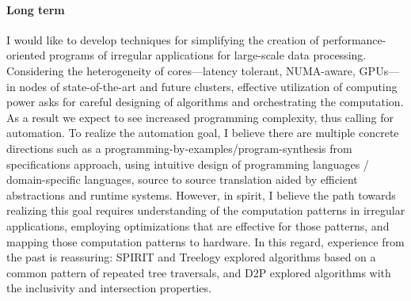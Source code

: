 \paragraph{Long term} I would like to develop techniques for simplifying the creation of performance-oriented programs of irregular applications for large-scale data processing. 
Considering the heterogeneity of cores---latency tolerant, NUMA-aware, GPUs---in nodes of state-of-the-art and future clusters, effective utilization of computing power asks for careful designing of algorithms and orchestrating the computation. 
As a result we expect to see increased programming complexity, thus calling for automation. 
To realize the automation goal, I believe there are multiple concrete directions such as a programming-by-examples/program-synthesis from specifications approach, using intuitive design of programming languages / domain-specific languages, source to source translation aided by efficient abstractions and runtime systems.
However, in spirit, I believe the path towards realizing this goal requires understanding of the computation patterns in irregular applications, employing optimizations that are effective for those patterns, and mapping those computation patterns to hardware.  
In this regard, experience from the past is reassuring: SPIRIT and Treelogy explored algorithms based on a common pattern of repeated tree traversals, and D2P explored algorithms with the inclusivity and intersection properties.%



